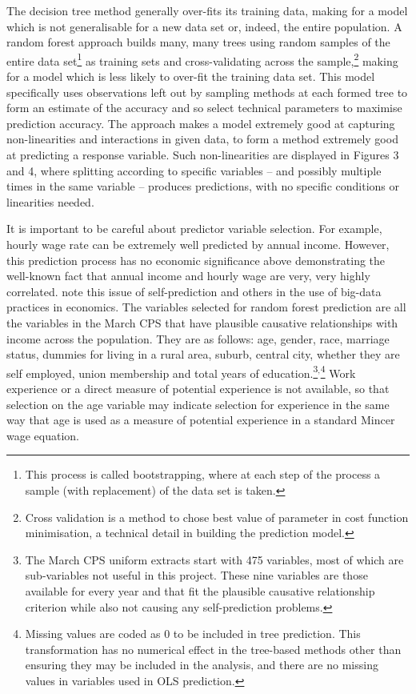 \documentclass[notitlepage,12pt]{article}
\newcommand{\1}[1]{\ensuremath{\mathbb{1}\left( #1 \right)}}               %
\begin{document}
The decision tree method generally over-fits its training data, making for a model which is not generalisable for a new data set or, indeed, the entire population.  A random forest approach builds many, many trees using random samples of the entire data set\footnote{This process is called bootstrapping, where at each step of the process a sample (with replacement) of the data set is taken.} as training sets and cross-validating across the sample,\footnote{Cross validation is a method to chose best value of parameter in cost function minimisation, a technical detail in building the prediction model.} making for a model which is less likely to over-fit the training data set.  This model specifically uses observations left out by sampling methods at each formed tree to form an estimate of the accuracy and so select technical parameters to maximise prediction accuracy.  The approach makes a model extremely good at capturing non-linearities and interactions in given data, to form a method extremely good at predicting a response variable.  Such non-linearities are displayed in Figures 3 and 4, where splitting according to specific variables -- and possibly multiple times in the same variable -- produces predictions, with no specific conditions or linearities needed.

It is important to be careful about predictor variable selection.  For example, hourly wage rate can be extremely well predicted by annual income.  However, this prediction process has no economic significance above demonstrating the well-known fact that annual income and hourly wage are very, very highly correlated.  \cite{mullainathan2017machine} note this issue of self-prediction and others in the use of big-data practices in economics.  The variables selected for random forest prediction are all the variables in the March CPS that have plausible causative relationships with income across the population.  They are as follows: age, gender, race, marriage status, dummies for living in a rural area, suburb, central city, whether they are self employed, union membership and total years of education.\footnote{The March CPS uniform extracts start with 475 variables, most of which are sub-variables not useful in this project.  These nine variables are those available for every year and that fit the plausible causative relationship criterion while also not causing any self-prediction problems.}$^{,}$\footnote{Missing values are coded as 0 to be included in tree prediction.  This transformation has no numerical effect in the tree-based methods other than ensuring they may be included in the analysis, and there are no missing values in variables used in OLS prediction.}  Work experience or a direct measure of potential experience is not available, so that selection on the age variable may indicate selection for experience in the same way that age is used as a measure of potential experience in a standard Mincer wage equation.
\end{document}
